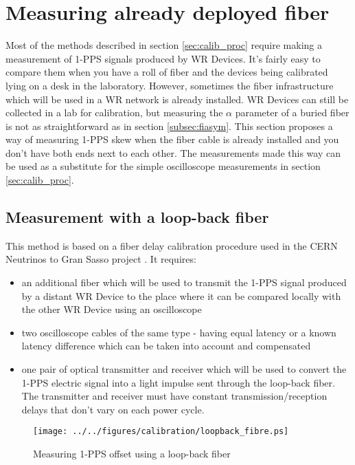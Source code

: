 \section{Measuring already deployed fiber}

Most of the methods described in section \ref{sec:calib_proc} require making a
measurement of 1-PPS signals produced by WR Devices. It's fairly easy to compare
them when you have a roll of fiber and the devices being calibrated lying on a
desk in the laboratory. However, sometimes the fiber infrastructure which
will be used in a WR network is already installed. WR Devices can still be
collected in a lab for calibration, but measuring the $\alpha$ parameter of a
buried fiber is not as straightforward as in section \ref{subsec:fiasym}. This
section proposes a way of measuring 1-PPS skew when the fiber cable is
already installed and you don't have both ends next to each other. The
measurements made this way can be used as a substitute for the simple
oscilloscope measurements in section \ref{sec:calib_proc}.

\subsection{Measurement with a loop-back fiber}
\label{subsec:loopback}
This method is based on a fiber delay calibration procedure used in the CERN
Neutrinos to Gran Sasso project \cite{cngs}. It requires:
\begin{itemize}
	\item an additional fiber which will be used to transmit the 1-PPS signal
		produced by a distant WR Device to the place where it can be compared
		locally with the other WR Device using an oscilloscope
	\item two oscilloscope cables of the same type - having equal latency or a
    known latency difference which can be taken into account and compensated
	\item one pair of optical transmitter and receiver which will be used to
		convert the 1-PPS electric signal into a light impulse sent through the
		loop-back fiber. The transmitter and receiver must have constant
		transmission/reception delays that don't vary on each power cycle.
\end{itemize}

\begin{figure}[ht]
	\begin{center}
	\texttt{[image: ../../figures/calibration/loopback\_fibre.ps]}
	\caption{Measuring 1-PPS offset using a loop-back fiber}
	\label{fig:loopback}
	\end{center}
\end{figure}

